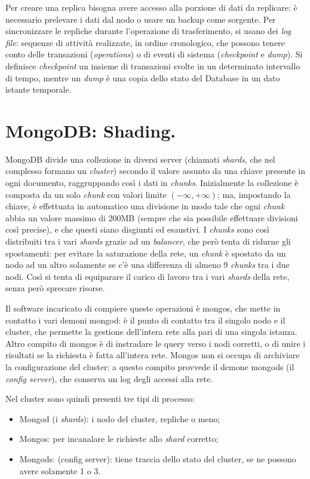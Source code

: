 \documentclass[a4page, 11pt]{article}
\begin{document}
Per creare una replica bisogna avere accesso alla porzione di dati da replicare: è necessario prelevare i dati dal nodo o usare un backup come sorgente.
Per sincronizzare le repliche durante l'operazione di trasferimento, si usano dei \textit{log file}: sequenze di attività realizzate, in ordine cronologico, che possono tenere conto delle transazioni (\textit{operations}) o di eventi di sistema (\textit{checkpoint} e \textit{dump}).
Si definisce \textit{checkpoint} un insieme di transazioni svolte in un determinato intervallo di tempo, mentre un \textit{dump} è una copia dello stato del Database in un dato istante temporale.

\section{MongoDB: Shading\cite{ScalingMongoDB}.}
MongoDB divide una collezione in diversi server (chiamati \textit{shards}, che nel complesso formano un \textit{cluster}) secondo il valore assunto da una chiave presente in ogni documento, raggruppando così i dati in \textit{chunks}.
Inizialmente la collezione è composta da un solo \textit{chunk} con valori limite $(-\infty, +\infty)$; ma, impostando la chiave, è effettuata in automatico una divisione in modo tale che ogni \textit{chunk} abbia un valore massimo di 200MB (sempre che sia possibile effettuare divisioni così precise), e che questi siano disgiunti ed esaustivi.
I \textit{chunks} sono così distribuiti tra i vari \textit{shards} grazie ad un \textit{balancer}, che però tenta di ridurne gli spostamenti: per evitare la saturazione della rete, un \textit{chunk} è spostato da un nodo ad un altro solamente se c'è una differenza di almeno 9 \textit{chunks} tra i due nodi.
Così si tenta di equiparare il carico di lavoro tra i vari \textit{shards} della rete, senza però sprecare risorse.

Il software incaricato di compiere queste operazioni è mongos, che mette in contatto i vari demoni mongod: è il punto di contatto tra il singolo nodo e il cluster, che permette la gestione dell'intera rete alla pari di una singola istanza.
Altro compito di mongos è di instradare le query verso i nodi corretti, o di unire i risultati se la richiesta è fatta all'intera rete.
Mongos non si occupa di archiviare la configurazione del cluster: a questo compito provvede il demone mongods (il \textit{config server}), che conserva un log degli accessi alla rete.

Nel cluster sono quindi presenti tre tipi di processo:
\begin{itemize}
\item Mongod (i \textit{shards}): i nodo del cluster, repliche o meno;
\item Mongos: per incanalare le richieste allo \textit{shard} corretto;
\item Mongods: (config server): tiene traccia dello stato del cluster, se ne possono avere solamente 1 o 3.
\end{itemize}
\end{document}

